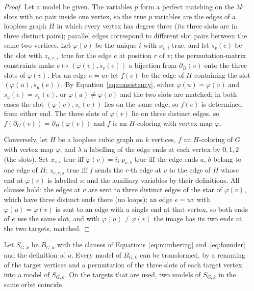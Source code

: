 \begin{proof}
Let a model be given. The variables $p$ form a perfect matching on the $3k$ slots with no pair inside one vertex, so the true $p$ variables are the edges of a loopless graph $H$ in which every vertex has degree three
(its three slots are in three distinct pairs); parallel edges correspond to different slot pairs between the same two vertices. Let $\varphi(v)$ be the unique $i$ with $x_{v,i}$ true, and let $s_v(e)$ be the slot
with $z_{v,r,s}$ true for the edge $e$ at position $r$ of $v$; the permutation-matrix constraints make $e \mapsto (\varphi(v), s_v(e))$ a bijection from $\partial_G(v)$ onto the three slots of $\varphi(v)$. For an edge
$e = uv$ let $f(e)$ be the edge of $H$ containing the slot $(\varphi(u), s_u(e))$. By Equation~\eqref{eq:consistency}, either $\varphi(u) = \varphi(v)$ and $s_u(e) = s_v(e)$, or $\varphi(u) \ne \varphi(v)$ and the two
slots are matched; in both cases the slot $(\varphi(v), s_v(e))$ lies on the same edge, so $f(e)$ is determined from either end. The three slots of $\varphi(v)$ lie on three distinct edges, so
$f(\partial_G(v)) = \partial_H(\varphi(v))$ and $f$ is an $H$-coloring with vertex map $\varphi$.

Conversely, let $H$ be a loopless cubic graph on $k$ vertices, $f$ an $H$-coloring of $G$ with vertex map $\varphi$, and $\lambda$ a labelling of the edge ends at each vertex by $0,1,2$ (the slots).
Set $x_{v,i}$ true iff $\varphi(v) = i$; $p_{a,b}$ true iff the edge ends $a$, $b$ belong to one edge of $H$; $z_{v,r,s}$ true iff $f$ sends the $r$-th edge at $v$ to the edge of $H$ whose end at $\varphi(v)$ is labelled $s$;
and the auxiliary variables by their definitions. All clauses hold: the edges at $v$ are sent to three distinct edges of the star of $\varphi(v)$, which have three distinct ends there (no loops); an edge $e = uv$ with
$\varphi(u) = \varphi(v)$ is sent to an edge with a single end at that vertex, so both ends of $e$ use the same slot, and with $\varphi(u) \ne \varphi(v)$ the image has its two ends at the two targets, matched.
\end{proof}

\begin{proposition}\label{prop:symmetry}
Let $S_{G,k}$ be $B_{G,k}$ with the clauses of Equations~\eqref{eq:numbering} and~\eqref{eq:founder} and the definition of $u$. Every model of $B_{G,k}$ can be transformed, by a renaming of the target vertices and a
permutation of the three slots of each target vertex, into a model of $S_{G,k}$. On the targets that are used, two models of $S_{G,k}$ in the same orbit coincide.
\end{proposition}

